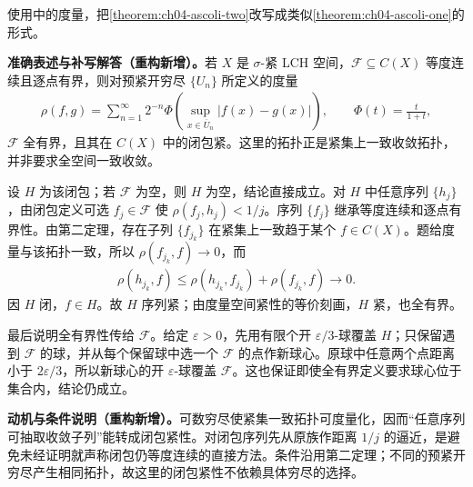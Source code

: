 \documentclass[../../main.tex]{subfiles}%
\begin{document}
\begin{exercise}\label{exercise:ch04-ascoli-compact-uniform}
使用中的度量，把\cref{theorem:ch04-ascoli-two}改写成类似\cref{theorem:ch04-ascoli-one}的形式。
\end{exercise}
\begin{solution}
\textbf{准确表述与补写解答（重构新增）。}若 $X$ 是 $\sigma$-紧 LCH 空间，$\mathcal F\subseteq C(X)$ 等度连续且逐点有界，则对预紧开穷尽 $\{U_n\}$ 所定义的度量
\begin{align*}
\rho(f,g)=\sum_{n=1}^{\infty}2^{-n}\Phi\!\left(\sup_{x\in\overline U_n}|f(x)-g(x)|\right),
\qquad \Phi(t)=\frac{t}{1+t},
\end{align*}
$\mathcal F$ 全有界，且其在 $C(X)$ 中的闭包紧。这里的拓扑正是紧集上一致收敛拓扑，并非要求全空间一致收敛。

设 $H$ 为该闭包；若 $\mathcal F$ 为空，则 $H$ 为空，结论直接成立。对 $H$ 中任意序列 $\{h_j\}$，由闭包定义可选 $f_j\in\mathcal F$ 使 $\rho(f_j,h_j)<1/j$。序列 $\{f_j\}$ 继承等度连续和逐点有界性。由第二定理，存在子列 $\{f_{j_k}\}$ 在紧集上一致趋于某个 $f\in C(X)$。题给度量与该拓扑一致，所以 $\rho(f_{j_k},f)\to0$，而
\begin{align*}
\rho(h_{j_k},f)\le\rho(h_{j_k},f_{j_k})+\rho(f_{j_k},f)\to0.
\end{align*}
因 $H$ 闭，$f\in H$。故 $H$ 序列紧；由度量空间紧性的等价刻画，$H$ 紧，也全有界。

最后说明全有界性传给 $\mathcal F$。给定 $\varepsilon>0$，先用有限个开 $\varepsilon/3$-球覆盖 $H$；只保留遇到 $\mathcal F$ 的球，并从每个保留球中选一个 $\mathcal F$ 的点作新球心。原球中任意两个点距离小于 $2\varepsilon/3$，所以新球心的开 $\varepsilon$-球覆盖 $\mathcal F$。这也保证即使全有界定义要求球心位于集合内，结论仍成立。
\end{solution}
\begin{remark}
\textbf{动机与条件说明（重构新增）。}可数穷尽使紧集一致拓扑可度量化，因而“任意序列可抽取收敛子列”能转成闭包紧性。对闭包序列先从原族作距离 $1/j$ 的逼近，是避免未经证明就声称闭包仍等度连续的直接方法。条件沿用第二定理；不同的预紧开穷尽产生相同拓扑，故这里的闭包紧性不依赖具体穷尽的选择。
\end{remark}
\end{document}
